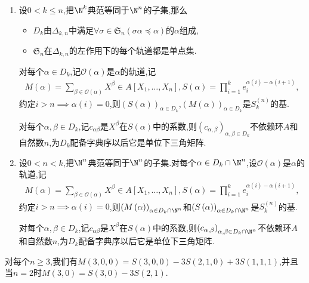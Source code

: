 \begin{remark}{}{}
	\begin{enumerate}
		\item 设$0<k\leq n$,把$\N^{k}$典范等同于$\N^{n}$的子集,那么
		\begin{itemize}
			\item $D_{k}$由$\Delta_{k,n}$中满足$\forall\sigma\in\mathfrak{S}_{n}\left(\sigma\alpha\preccurlyeq\alpha\right)$的$\alpha$组成,
			\item $\mathfrak{S}_{n}$在$\Delta_{k,n}$的左作用下的每个轨道都是单点集.
		\end{itemize}
		对每个$\alpha\in D_{k}$,记$\mathcal{O}\left(\alpha\right)$是$\alpha$的轨道,记
		\begin{align*}
			M\left(\alpha\right)=\sum\limits_{\beta\in\mathcal{O}\left(\alpha\right)}X^{\beta}\in A[X_{1},\ldots,X_{n}],S\left(\alpha\right)=\prod\limits_{i=1}^{k}e_{i}^{\alpha\left(i\right)-\alpha\left(i+1\right)},
		\end{align*}
		约定$i>n\implies\alpha\left(i\right)=0$,则$\left(S\left(\alpha\right)\right)_{\alpha\in D_{k}}$,$\left(M\left(\alpha\right)\right)_{\alpha\in D_{k}}$是$S_{k}^{\left(n\right)}$的基.
		
		对每个$\alpha,\beta\in D_{k}$,记$c_{\alpha\beta}$是$X^{\beta}$在$S\left(\alpha\right)$中的系数,则$\left(c_{\alpha,\beta}\right)_{\alpha,\beta\in D_{k}}$不依赖环$A$和自然数$n$,为$D_{k}$配备字典序以后它是单位下三角矩阵.
		\item 设$0<n<k$,把$\N^{n}$典范等同于$\N^{n}$的子集.对每个$\alpha\in D_{k}\cap\N^{n}$,设$\mathcal{O}\left(\alpha\right)$是$\alpha$的轨道,记
		\begin{align*}
			M\left(\alpha\right)=\sum\limits_{\beta\in\mathcal{O}\left(\alpha\right)}X^{\beta}\in A[X_{1},\ldots,X_{n}],S\left(\alpha\right)=\prod\limits_{i=1}^{k}e_{i}^{\alpha\left(i\right)-\alpha\left(i+1\right)},
		\end{align*}
		约定$i>n\implies\alpha\left(i\right)=0$,则$\left(M\left(\alpha\right)\right)_{\alpha\in D_{k}\cap\N^{n}}$和$\left(S\left(\alpha\right)\right)_{\alpha\in D_{k}\cap\N^{n}}$是$S_{k}^{\left(n\right)}$的基.
		
		对每个$\alpha,\beta\in D_{k}$,记$c_{\alpha\beta}$是$X^{\beta}$在$S\left(\alpha\right)$中的系数,则$\left(c_{\alpha,\beta}\right)_{\alpha,\beta\in D_{k}\cap\N^{n}}$不依赖环$A$和自然数$n$,为$D_{k}$配备字典序以后它是单位下三角矩阵.
	\end{enumerate}
\end{remark}

\begin{example}{}{}
	对每个$n\geq 3$,我们有$M\left(3,0,0\right)=S\left(3,0,0\right)-3S\left(2,1,0\right)+3S\left(1,1,1\right)$,并且当$n=2$时$M\left(3,0\right)=S\left(3,0\right)-3S\left(2,1\right)$.
\end{example}


























